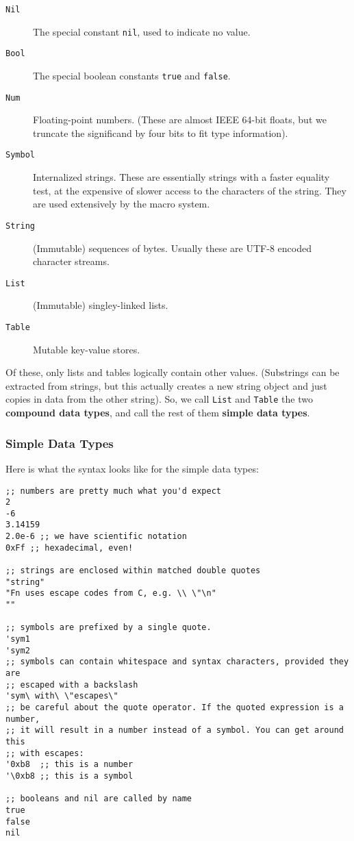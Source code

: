 \documentclass[11pt]{article}
\begin{document}
\begin{description}
\item[{\texttt{Nil}}] The special constant \texttt{nil}, used to indicate no value.
\item[{\texttt{Bool}}] The special boolean constants \texttt{true} and \texttt{false}.
\item[{\texttt{Num}}] Floating-point numbers. (These are almost IEEE 64-bit floats, but we
truncate the significand by four bits to fit type information).
\item[{\texttt{Symbol}}] Internalized strings. These are essentially strings with a faster
equality test, at the expensive of slower access to the characters of the
string. They are used extensively by the macro system.
\item[{\texttt{String}}] (Immutable) sequences of bytes. Usually these are UTF-8 encoded
character streams.
\item[{\texttt{List}}] (Immutable) singley-linked lists.
\item[{\texttt{Table}}] Mutable key-value stores.
\end{description}

Of these, only lists and tables logically contain other values. (Substrings can
be extracted from strings, but this actually creates a new string object and
just copies in data from the other string). So, we call \texttt{List} and \texttt{Table} the two
\textbf{compound data types}, and call the rest of them \textbf{simple data types}.

\subsubsection{Simple Data Types}
\label{sec:orgd68ab38}
Here is what the syntax looks like for the simple data types:

\begin{verbatim}
;; numbers are pretty much what you'd expect
2
-6
3.14159
2.0e-6 ;; we have scientific notation
0xFf ;; hexadecimal, even!

;; strings are enclosed within matched double quotes
"string"
"Fn uses escape codes from C, e.g. \\ \"\n"
""

;; symbols are prefixed by a single quote.
'sym1
'sym2
;; symbols can contain whitespace and syntax characters, provided they are 
;; escaped with a backslash
'sym\ with\ \"escapes\"
;; be careful about the quote operator. If the quoted expression is a number,
;; it will result in a number instead of a symbol. You can get around this 
;; with escapes:
'0xb8  ;; this is a number
'\0xb8 ;; this is a symbol

;; booleans and nil are called by name
true
false
nil
\end{verbatim}
\end{document}
